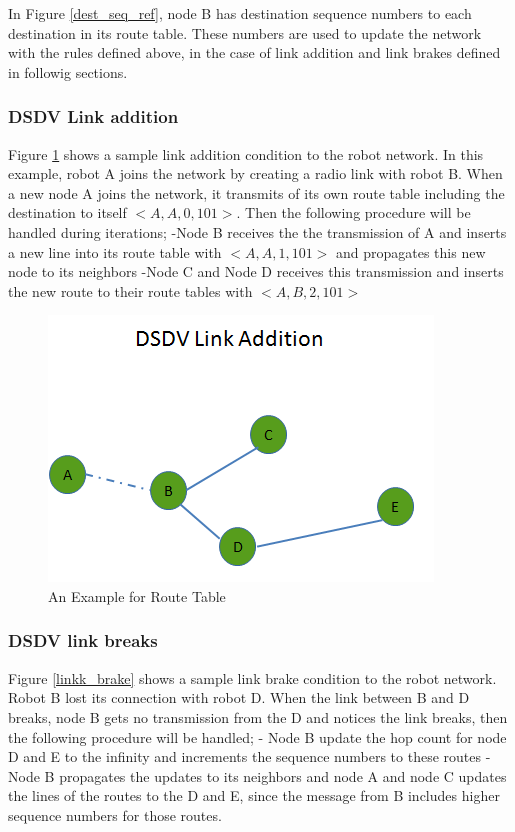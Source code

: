 In Figure \ref{dest_seq_ref}, node B has destination sequence numbers to each destination in its route table. These numbers are used to update the network with the rules defined above, in the case of link addition and link brakes defined in followig sections.
\newpage	
\subsubsection{DSDV Link addition}

Figure \ref{linkk_addition} shows a sample link addition condition to the robot network. In this example, robot A joins the network by creating a radio link with robot B. When a new node A joins the network, it transmits of its own route table including the destination to itself $<A,A,0,101>$. Then the following procedure will be handled during iterations; \newline
	-Node B receives the the transmission of A and inserts a new line into its route table with $<A,A,1,101>$ and propagates this new node to its neighbors \newline
	-Node C and Node D receives this transmission and inserts the new route to their route tables with $<A,B,2,101>$

\begin{figure}[H]
\caption{An Example for Route Table} \label{linkk_addition}
\centering
\includegraphics[scale = 0.65]{link_add}
\end{figure}	
		
\subsubsection{DSDV link breaks}

Figure \ref{linkk_brake} shows a sample link brake condition to the robot network. Robot B lost its connection with robot D. When the link between B and D breaks, node B gets no transmission from the D and notices the link breaks, then the following procedure will be handled; \newline
	- Node B update the hop count for node D and E to the infinity and increments the sequence numbers to these routes \newline
	- Node B propagates the updates to its neighbors and node A and node C updates the lines of the routes to the D and E, since the message from B includes higher sequence numbers for those routes.
		
